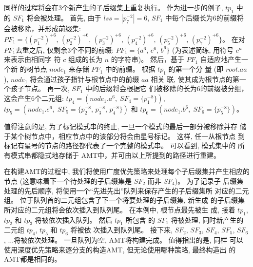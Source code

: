 同样的过程将会在3个新产生的子后缀集上重复执行。 作为进一步的例子,
$tp_1$ 中的 $SF_1$ 将会被处理。 首先, 由于 $lss = |p_7^{-2}| = 6$,
$SF_1$ 中每个后缀长为6的前缀将会被移除，并形成前缀集:
$PF_1 = \{(p_1^{-2})^{+6},\, (p_2^{-2})^{+6},\, (p_3^{-2})^{+6},\,
(p_4^{-2})^{+6},\, (p_5^{-2})^{+6},\,
(p_7^{-2})^{+6}\}$。 在对 $PF_1$去重之后, 仅剩余3个不同的前缀:
$PF_1 = \{a^6,\, e^6,\, b^6\}$ (为表述简练, 用符号 $c^n$ 来表示由相同字
符 $c$ 组成的长为 $n$ 的字符串)。  然后，基于 $PF_1$ 自适应地产生一个新
的树节点 $node_1$ 来存储 $PF_1$ 中的前缀。 根据 $tp_1$ 的第一个分
量 (即 $root.aa$), $node_1$ 将会通过孩子指针与根节点中的前缀 $aa$ 相关
联, 使其成为根节点的第一个孩子节点。 再一次, $SF_1$ 中的后缀将会根据它
们被移除的长为6的前缀被分组，这会产生6个二元组: $tp_4 = (node_1.a^6,\;
SF_4=\{p_1^{-8}\})$,
$tp_5 = (node_1.e^6,\; SF_5=\{p_2^{-8},\, p_3^{-8},\,
p_4^{-8}\})$ 和 $tp_6 = (node_1.b^6,\; SF_6=\{p_5^{-8}\})$。

值得注意的是, 为了标记模式串的终止, 一旦一个模式的最后一部分被移除并存
储于某个树节点中，相应节点中的该部分将会由星号标记。 这样, 任一从根节点
到标记有星号的节点的路径都代表了一个完整的模式串。 可以看到, 模式集中的
所有模式串都隐式地存储于 AMT中，并可由以上所提到的路径进行重建。

在构建AMT的过程中, 我们将使用广度优先策略来处理每个子后缀集并产生相应的
节点 (这意味着下一个待处理的子后缀集是 $SF_2$ 而非 $SF_4$)。 为了记录子
后缀集处理的先后顺序, 将使用一个“先进先出”队列来保存产生的子后缀集所
对应的二元组。 位于队列首的二元组包含了下一个将要处理的子后缀集, 新生成
的子后缀集所对应的二元组将会依次插入到队列尾。 在本例中, 根节点最先被生
成, 接着 $tp_1$, $tp_2$ 和 $tp_3$ 将被依次插入队列。 然后 $tp_1$ 所包含
的 $SF_1$ 将被处理, 同时新产生的二元组 $tp_4$, $tp_5$ 和 $tp_6$ 将被依
次插入到队列尾。 接下来, $SF_2$, $SF_3$, $SF_4$, $SF_5$, $SF_6$,
$\dots$将被依次处理。 一旦队列为空, AMT将构建完成。 值得指出的是, 同样
可以使用深度优先策略来逐分支的构造AMT, 但无论使用哪种策略, 最终构造出
的AMT都是相同的。


